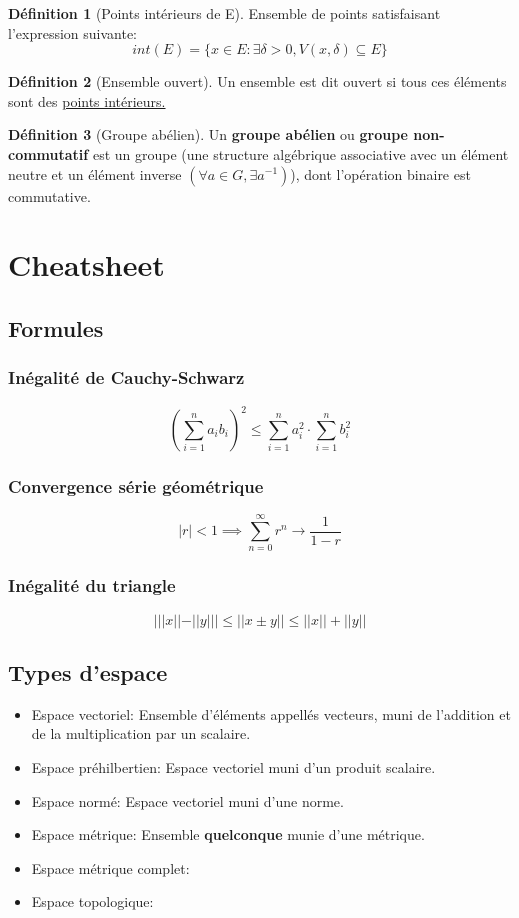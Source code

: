 \documentclass[12pt]{book}
\newcommand\todo[1]{\phantom{#1}}
\theoremstyle{definition}
\newtheorem{definition}{Définition}[section]
\begin{document}
\begin{definition}[Points intérieurs de E]
    \label{def:point_int}
    Ensemble de points satisfaisant l'expression
    suivante: $$int(E) = \{ x \in E : \exists \delta > 0, V(x, \delta) \subseteq E \} $$
\end{definition}

\begin{definition}[Ensemble ouvert]
    \label{def:ensemble_ouvert}
    Un ensemble est dit ouvert si tous ces éléments sont des \hyperref[def:point_int]{points intérieurs.}
\end{definition}

\begin{definition}[Groupe abélien]
    \label{def:groupe_abelien}
    Un \textbf{groupe abélien} ou \textbf{groupe non-commutatif} est un groupe
    (une structure algébrique associative avec un élément neutre et un élément inverse $(\forall a \in G, \exists a^{-1})$), 
    dont l'opération binaire est commutative.
\end{definition}
\todo{Add reference}

\chapter{Cheatsheet}
\section{Formules}
\subsection{Inégalité de Cauchy-Schwarz}
$$(\sum_{i=1}^{n} a_ib_i)^2 \leq \sum_{i=1}^{n} a_i^2 \cdot \sum_{i=1}^{n} b_i ^ 2$$ 
\subsection{Convergence série géométrique}
$$|r| < 1 \implies \sum_{n=0}^{\infty} r^n \to \frac{1}{1 - r} $$
\subsection{Inégalité du triangle}
$$| ||x|| - ||y|| | \leq ||x \pm y|| \leq ||x|| + ||y|| $$
\section{Types d'espace}
\begin{itemize}
    \item Espace vectoriel: Ensemble d'éléments appellés vecteurs, muni de l'addition et de la multiplication par un scalaire.
    \item Espace préhilbertien: Espace vectoriel muni d'un produit scalaire.
    \item Espace normé: Espace vectoriel muni d'une norme.
    \item Espace métrique: Ensemble \textbf{quelconque} munie d'une métrique.
    \item Espace métrique complet:
    \item Espace topologique:
\end{itemize}
\end{document}
